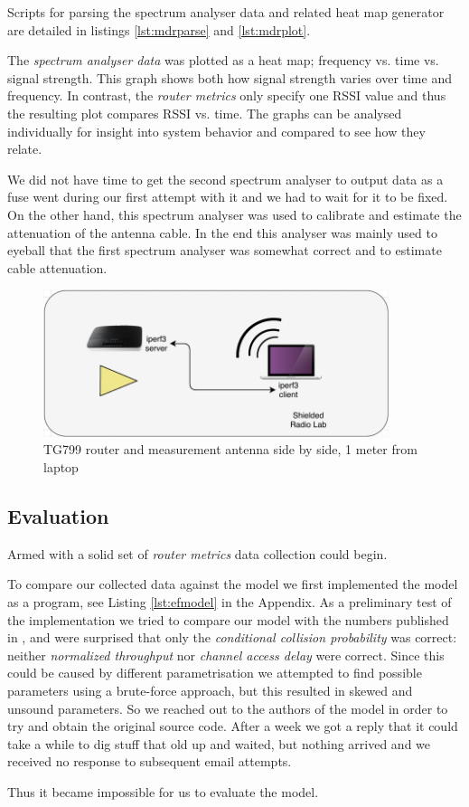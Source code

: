 Scripts for parsing the spectrum analyser data and related heat map generator
are detailed in listings \ref{lst:mdrparse} and \ref{lst:mdrplot}.

The \emph{spectrum analyser data} was plotted as a heat map; frequency vs. time
vs. signal strength. This graph shows both how signal strength varies over time
and frequency. In contrast, the \emph{router metrics} only specify one RSSI
value and thus the resulting plot compares RSSI vs. time. The graphs can be
analysed individually for insight into system behavior and compared to see how
they relate.

We did not have time to get the second spectrum analyser to output data as a
fuse went during our first attempt with it and we had to wait for it to be
fixed. On the other hand, this spectrum analyser was used to calibrate and
estimate the attenuation of the antenna cable. In the end this analyser was
mainly used to eyeball that the first spectrum analyser was somewhat correct
and to estimate cable attenuation.

\begin{figure}
\center
\includegraphics[width=0.9\textwidth]{images/rssi-exp.pdf}
\caption{TG799 router and measurement antenna side by side, 1 meter from laptop}
\label{fig:rssi_setup}
\end{figure}

\subsection{Evaluation}

Armed with a solid set of \emph{router metrics} data collection could begin.

To compare our collected data against the model we first implemented the model
as a program, see Listing \ref{lst:efmodel} in the Appendix. As a preliminary
test of the implementation we tried to compare our model with the numbers
published in \cite{felemban}, and were surprised that only the
\emph{conditional collision probability} was correct: neither \emph{normalized
throughput} nor \emph{channel access delay} were correct. Since this could be
caused by different parametrisation we attempted to find possible parameters
using a brute-force approach, but this resulted in skewed and unsound
parameters. So we reached out to the authors of the model in order to try and
obtain the original source code. After a week we got a reply that it could
take a while to dig stuff that old up and waited, but nothing arrived and we
received no response to subsequent email attempts.

Thus it became impossible for us to evaluate the model.
